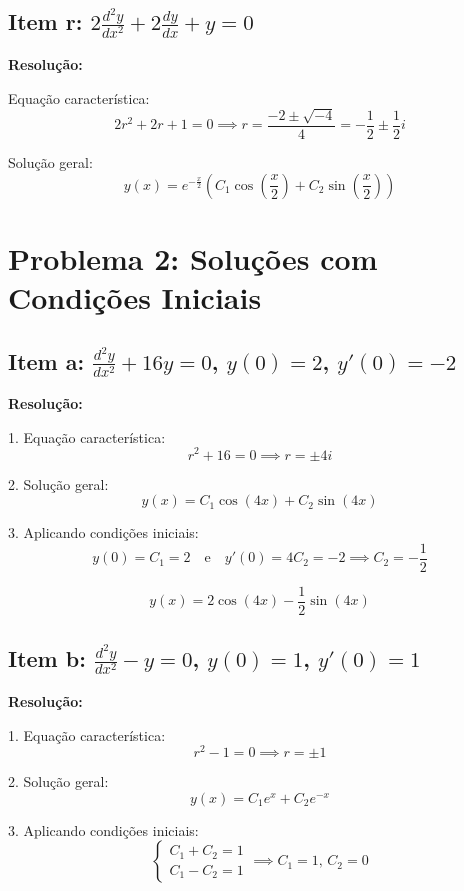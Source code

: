 \documentclass[12pt,a4paper]{article}
\begin{document}
\subsection*{Item r: \(2 \frac{d^2 y}{dx^2} + 2 \frac{dy}{dx} + y = 0\)}

\textbf{Resolução:}

Equação característica:
\[
2r^2 + 2r + 1 = 0 \implies r = \frac{-2 \pm \sqrt{-4}}{4} = -\frac{1}{2} \pm \frac{1}{2}i
\]

Solução geral:
\[
\boxed{y(x) = e^{-\frac{x}{2}}\left(C_1 \cos\left(\frac{x}{2}\right) + C_2 \sin\left(\frac{x}{2}\right)\right)}
\]

\newpage

\section*{Problema 2: Soluções com Condições Iniciais}

\subsection*{Item a: \(\frac{d^2 y}{dx^2} + 16y = 0\), \(y(0) = 2\), \(y'(0) = -2\)}

\textbf{Resolução:}

1. Equação característica:
\[
r^2 + 16 = 0 \implies r = \pm 4i
\]

2. Solução geral:
\[
y(x) = C_1 \cos(4x) + C_2 \sin(4x)
\]

3. Aplicando condições iniciais:
\[
y(0) = C_1 = 2 \quad \text{e} \quad y'(0) = 4C_2 = -2 \implies C_2 = -\frac{1}{2}
\]

\[
\boxed{y(x) = 2\cos(4x) - \frac{1}{2}\sin(4x)}
\]

\subsection*{Item b: \(\frac{d^2 y}{dx^2} - y = 0\), \(y(0) = 1\), \(y'(0) = 1\)}

\textbf{Resolução:}

1. Equação característica:
\[
r^2 - 1 = 0 \implies r = \pm 1
\]

2. Solução geral:
\[
y(x) = C_1 e^{x} + C_2 e^{-x}
\]

3. Aplicando condições iniciais:
\[
\begin{cases}
C_1 + C_2 = 1 \\
C_1 - C_2 = 1
\end{cases} \implies C_1 = 1, \, C_2 = 0
\]
\end{document}
